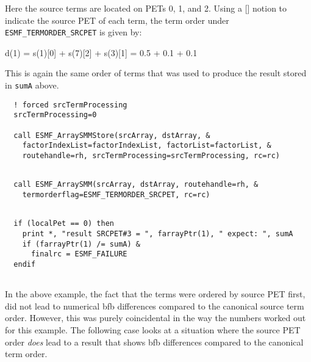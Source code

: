 
   Here the source terms are located on PETs 0, 1, and 2. Using a [] notion to
   indicate the source PET of each term, the term order under 
   {\tt ESMF\_TERMORDER\_SRCPET} is given by:
  
       d(1) = s(1)[0] + s(7)[2] + s(3)[1] = 0.5 + 0.1 + 0.1
  
   This is again the same order of terms that was used to produce the result 
   stored in {\tt sumA} above. 

 \begin{verbatim}
  ! forced srcTermProcessing
  srcTermProcessing=0
    
  call ESMF_ArraySMMStore(srcArray, dstArray, &
    factorIndexList=factorIndexList, factorList=factorList, &
    routehandle=rh, srcTermProcessing=srcTermProcessing, rc=rc)
 
\end{verbatim}
 

 \begin{verbatim}
  call ESMF_ArraySMM(srcArray, dstArray, routehandle=rh, &
    termorderflag=ESMF_TERMORDER_SRCPET, rc=rc)
 
\end{verbatim}
 

 \begin{verbatim}
  if (localPet == 0) then
    print *, "result SRCPET#3 = ", farrayPtr(1), " expect: ", sumA
    if (farrayPtr(1) /= sumA) &
      finalrc = ESMF_FAILURE
  endif
 
\end{verbatim}
 

   In the above example, the fact that the terms were ordered by source PET
   first, did not lead to numerical bfb differences compared to the canonical 
   source term order. However, this was purely coincidental in the way the
   numbers worked out for this example. The following case looks at a situation
   where the source PET order {\em does} lead to a result that shows bfb
   differences compared to the canonical term order. 

